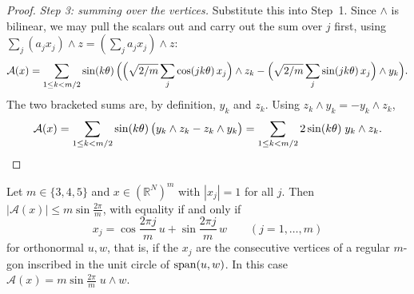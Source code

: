 \begin{proof}
  \emph{Step 3: summing over the vertices.} Substitute this into Step~1.
  Since $\wedge$ is bilinear, we may pull the scalars out and carry out the
  sum over $j$ first, using $\sum_{j} (a_{j} x_{j}) \wedge z =
  (\sum_{j} a_{j} x_{j}) \wedge z$:
  \[
    \mathcal{A}(x)
      = \sum_{1 \leq k < m/2} \sin(k\theta)\,
        \Bigl( \Bigl(\sqrt{2/m} \sum_{j} \cos(jk\theta)\, x_{j}\Bigr)
          \wedge z_{k}
        - \Bigl(\sqrt{2/m} \sum_{j} \sin(jk\theta)\, x_{j}\Bigr)
          \wedge y_{k} \Bigr).
  \]
  The two bracketed sums are, by definition, $y_{k}$ and $z_{k}$. Using
  $z_{k} \wedge y_{k} = -y_{k} \wedge z_{k}$,
  \[
    \mathcal{A}(x)
      = \sum_{1 \leq k < m/2} \sin(k\theta)\,
        \bigl(y_{k} \wedge z_{k} - z_{k} \wedge y_{k}\bigr)
      = \sum_{1 \leq k < m/2} 2\sin(k\theta)\; y_{k} \wedge z_{k}.
    \qedhere
  \]
\end{proof}

\begin{proposition}
  \label{prop:polygon}
  Let $m \in \{3, 4, 5\}$ and $x \in (\mathbb{R}^{N})^{m}$ with $|x_{j}| = 1$
  for all $j$. Then $|\mathcal{A}(x)| \leq m\sin\frac{2\pi}{m}$, with equality
  if and only if
  \begin{equation}
    \label{eq:regular}
    x_{j} = \cos\frac{2\pi j}{m}\,u + \sin\frac{2\pi j}{m}\,w
      \qquad (j = 1, \ldots, m)
  \end{equation}
  for orthonormal $u, w$, that is, if the $x_{j}$ are the consecutive vertices
  of a regular $m$-gon inscribed in the unit circle of $\operatorname{span}(u, w)$. In this
  case $\mathcal{A}(x) = m\sin\frac{2\pi}{m}\; u \wedge w$.
\end{proposition}

